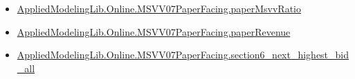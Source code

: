 \documentclass[10pt]{article}
\begin{document}
\begin{itemize}
\item \hyperlink{governing-declaration-11865634591d1a39}{Applied\allowbreak{}Modeling\allowbreak{}Lib.\allowbreak{}Online.\allowbreak{}MSVV07\allowbreak{}Paper\allowbreak{}Facing.\allowbreak{}paper\allowbreak{}Msvv\allowbreak{}Ratio}
\item \hyperlink{governing-declaration-3d5795d9eda3f090}{Applied\allowbreak{}Modeling\allowbreak{}Lib.\allowbreak{}Online.\allowbreak{}MSVV07\allowbreak{}Paper\allowbreak{}Facing.\allowbreak{}paper\allowbreak{}Revenue}
\item \hyperlink{governing-declaration-5cea0eb3c7a14423}{Applied\allowbreak{}Modeling\allowbreak{}Lib.\allowbreak{}Online.\allowbreak{}MSVV07\allowbreak{}Paper\allowbreak{}Facing.\allowbreak{}section6\_\allowbreak{}next\_\allowbreak{}highest\_\allowbreak{}bid\_\allowbreak{}all}
\end{itemize}
\end{document}
